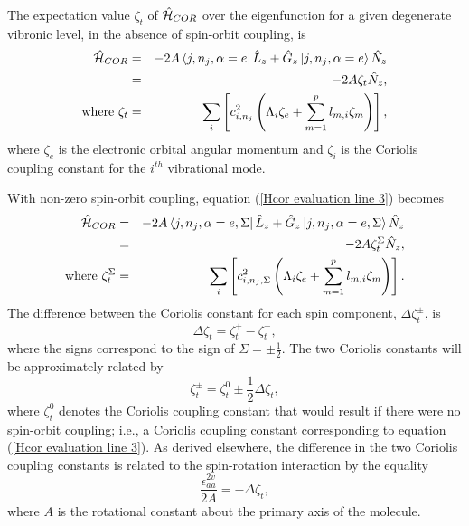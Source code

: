 \documentclass{article}
\begin{document}
The expectation value $\zeta _t$ of  $\hat{\cal H}_{COR}$ over the
eigenfunction for a given degenerate vibronic level, in the absence of
spin-orbit coupling, is 
\begin{eqnarray}
\hat{\cal H}_{COR}
&=&-2A\left\langle j,n_{j},\alpha =e\right| \hat{L}_z + \hat{G}_z
\left| j,n_{j},\alpha =e\right\rangle \hat{N}_z   \label{Hcor evaluation line 1} \\
&=&-2A\zeta _{t} \hat{N}_z,  \label{Hcor evaluation line 2} \\
\text{where }\zeta _{t} &=&\sum_{i}\left[ c_{i,n_j}^{2}\left( \Lambda _{i}\zeta
_{e}+\sum\limits_{m=1}^{p}l_{m,i}\zeta _{m}\right) \right] ,
\label{Hcor evaluation line 3}
\end{eqnarray}
where $\zeta _{e}$ is the electronic orbital angular momentum and
$\zeta _{i}$ is the Coriolis coupling constant for the $i^{th}$
vibrational mode.

With non-zero spin-orbit coupling, equation (\ref{Hcor evaluation line
  3}) becomes 
\begin{eqnarray}
\hat{\cal H}_{COR}
&=&-2A\left\langle j,n_{j},\alpha =e,\Sigma \right| \hat{L}_z + \hat{G}_z
\left| j,n_{j},\alpha =e,\Sigma \right\rangle \hat{N}_z  \\ 
&=&-2A\zeta _{t}^\Sigma  \hat{N}_z,  \\
\text{where }\zeta _{t}^\Sigma  &=&\sum_{i}\left[ c_{i,n_j,\Sigma
    }^{2}\left( \Lambda _{i}\zeta
    _{e}+\sum\limits_{m=1}^{p}l_{m,i}\zeta _{m}\right) \right] .
\label{Hcor with spin}
\end{eqnarray}
The difference between the Coriolis constant for each spin component,
$\Delta \zeta _t^\pm $, is
\begin{equation}
\Delta \zeta _t = \zeta _t^+ - \zeta _t^-,
\label{delta zeta spin}
\end{equation}
where the signs correspond to the sign of $\Sigma = \pm \frac12 $. The
two Coriolis constants will be approximately related by
\begin{equation}
\zeta _t^\pm = \zeta _t^0 \pm \frac12 \Delta \zeta _t , \label{zetaspinrot}
\end{equation}
where $\zeta _t^0$ denotes the Coriolis coupling
constant that would result if there were no spin-orbit coupling; i.e.,
a Coriolis coupling constant corresponding to equation 
(\ref{Hcor evaluation line 3}).
As derived elsewhere,\cite{tab4} the difference in the two Coriolis
coupling constants is related to the spin-rotation interaction by the equality
\begin{equation}
\frac{\epsilon _{aa}^{2v}}{2A} = -\Delta \zeta _t ,
\label{deltazetaepsilonaa}
\end{equation}
where $A$ is the rotational constant about the primary axis of the molecule.
\end{document}
